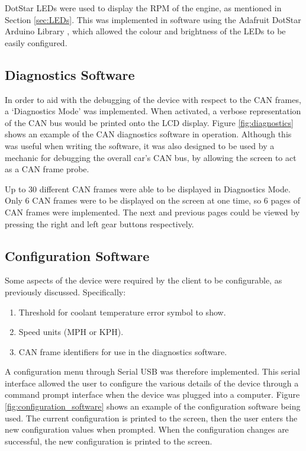 \documentclass[a4paper,12pt]{article}
\begin{document}
DotStar LEDs were used to display the RPM of the engine, as mentioned in Section \ref{sec:LEDs}. This was implemented in software using the Adafruit DotStar Arduino Library \cite{dotstar_library}, which allowed the colour and brightness of the LEDs to be easily configured.

\subsection{Diagnostics Software}
\label{sec:diagnostics_software}

In order to aid with the debugging of the device with respect to the CAN frames, a `Diagnostics Mode' was implemented.  When activated, a verbose representation of the CAN bus would be printed onto the LCD display. Figure \ref{fig:diagnostics} shows an example of the CAN diagnostics software in operation. Although this was useful when writing the software, it was also designed to be used by a mechanic for debugging the overall car's CAN bus, by allowing the screen to act as a CAN frame probe.



Up to 30 different CAN frames were able to be displayed in Diagnostics Mode. Only 6 CAN frames were to be displayed on the screen at one time, so 6 pages of CAN frames were implemented. The next and previous pages could be viewed by pressing the right and left gear buttons respectively.

\subsection{Configuration Software}
\label{sec:configuration_software}

Some aspects of the device were required by the client to be configurable, as previously discussed. Specifically:

\begin{enumerate}
  \item Threshold for coolant temperature error symbol to show.
  \item Speed units (MPH or KPH).
  \item CAN frame identifiers for use in the diagnostics software.
\end{enumerate}

A configuration menu through Serial USB was therefore implemented. This serial interface allowed the user to configure the various details of the device through a command prompt interface when the device was plugged into a computer. Figure \ref{fig:configuration_software} shows an example of the configuration software being used. The current configuration is printed to the screen, then the user enters the new configuration values when prompted. When the configuration changes are successful, the new configuration is printed to the screen. \\
\end{document}
